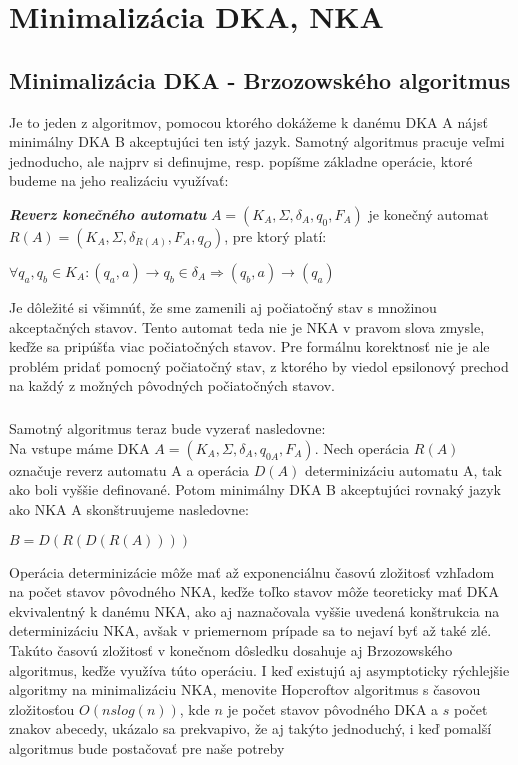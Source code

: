 \chapter{Minimalizácia DKA, NKA}

\label{brzozowski}
\section{Minimalizácia DKA - Brzozowského algoritmus}

Je to jeden z algoritmov, pomocou ktorého dokážeme k danému DKA A nájsť minimálny DKA B akceptujúci ten istý jazyk. Samotný algoritmus pracuje veľmi jednoducho, ale najprv si definujme, resp. popíšme základne operácie, ktoré budeme na jeho realizáciu využívať:

\begin{defn}{\textbf {\textit {Reverz konečného automatu}}} $A=(K_A,\Sigma,\delta_A,q_{0},F_A)$ je konečný automat $R(A)=(K_A,\Sigma,\delta_{R(A)},F_A,q_{O})$, pre ktorý platí:
\\
\centerline{$\forall q_a,q_b \in K_A: (q_a,a) \rightarrow q_b \in \delta_A \Rightarrow (q_b,a)\rightarrow(q_a)$}
\end{defn}
Je dôležité si všimnúť, že sme zamenili aj počiatočný stav s množinou akceptačných stavov. Tento automat teda nie je NKA v pravom slova zmysle, keďže sa pripúšťa viac počiatočných stavov. Pre formálnu korektnosť nie je ale problém pridať pomocný počiatočný stav, z ktorého by viedol epsilonový prechod na každý z možných pôvodných počiatočných stavov.
\paragraph{}
Samotný algoritmus teraz bude vyzerať nasledovne:\\
Na vstupe máme DKA $A=(K_A,\Sigma,\delta_A,q_{0A},F_A)$. Nech operácia $R(A)$ označuje reverz automatu A a operácia $D(A)$ determinizáciu automatu A, tak ako boli vyššie definované. Potom minimálny DKA B akceptujúci rovnaký jazyk ako NKA A skonštruujeme nasledovne:
\\
\centerline{$B=D(R(D(R(A))))$}
Operácia determinizácie môže mať až exponenciálnu časovú zložitosť vzhľadom na počet stavov pôvodného NKA, keďže toľko stavov môže teoreticky mať DKA ekvivalentný k danému NKA, ako aj naznačovala vyššie uvedená konštrukcia na determinizáciu NKA, avšak v priemernom prípade sa to nejaví byť až také zlé. Takúto časovú zložitosť v konečnom dôsledku dosahuje aj Brzozowského algoritmus, keďže využíva túto operáciu. I keď existujú aj asymptoticky rýchlejšie algoritmy na minimalizáciu NKA, menovite Hopcroftov algoritmus s časovou zložitosťou $O(nslog(n))$, kde $n$ je počet stavov pôvodného DKA a $s$ počet znakov abecedy, ukázalo sa prekvapivo, že aj takýto jednoduchý, i keď pomalší algoritmus bude postačovať pre naše potreby

